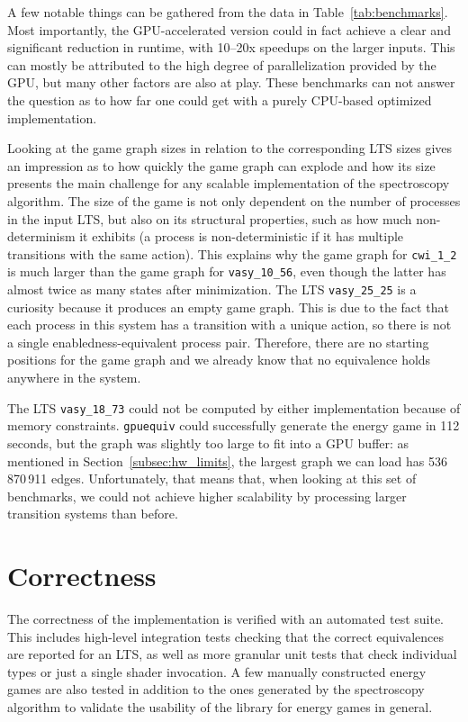 A few notable things can be gathered from the data in
Table~\ref{tab:benchmarks}.
Most importantly, the GPU-accelerated version could in fact achieve
a clear and significant reduction in runtime,
with 10--20x speedups on the larger inputs.
This can mostly be attributed to the high degree of parallelization provided by
the GPU,
but many other factors are also at play.
These benchmarks can not answer the question as to how far one could get with
a purely CPU-based optimized implementation.

Looking at the game graph sizes in relation to the corresponding LTS sizes
gives an impression as to how quickly the game graph can explode
and how its size presents the main challenge for any scalable implementation of
the spectroscopy algorithm.
The size of the game is not only dependent on the number of processes in the
input LTS,
but also on its structural properties,
such as how much non-determinism it exhibits
(a process is non-deterministic if it has multiple transitions with the same
action).
This explains why the game graph for \texttt{cwi\_1\_2} is much larger
than the game graph for \texttt{vasy\_10\_56},
even though the latter has almost twice as many states after minimization.
The LTS \texttt{vasy\_25\_25} is a curiosity
because it produces an empty game graph.
This is due to the fact that each process in this system has a transition
with a unique action,
so there is not a single enabledness-equivalent process pair.
Therefore, there are no starting positions for the game graph and we already
know that no equivalence holds anywhere in the system.

The LTS \texttt{vasy\_18\_73} could not be computed by either implementation
because of memory constraints.
\texttt{gpuequiv} could successfully generate the energy game in 112 seconds,
but the graph was slightly too large to fit into a GPU buffer:
as mentioned in Section~\ref{subsec:hw_limits},
the largest graph we can load has 536\,870\,911 edges.
Unfortunately, that means that,
when looking at this set of benchmarks,
we could not achieve higher scalability by processing larger transition systems
than before.

\section{Correctness}

The correctness of the implementation is verified with an automated test suite.
This includes high-level integration tests checking that the correct
equivalences are reported for an LTS,
as well as more granular unit tests that check individual types or just a
single shader invocation.
A few manually constructed energy games are also tested in addition to the ones
generated by the spectroscopy algorithm
to validate the usability of the library for energy games in general.


